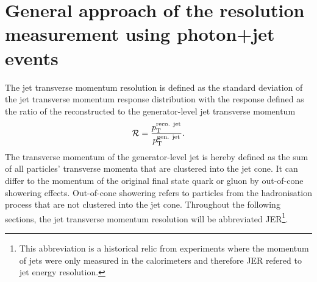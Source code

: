 \chapter{General approach of the resolution measurement using photon+jet events}
\label{res:ch:GeneralApproach}

The jet transverse momentum resolution is defined as the standard deviation of the jet transverse momentum response distribution with the response defined as the ratio of the reconstructed to the generator-level jet transverse momentum 
\begin{equation}\label{res:eq:responseFormula}
\mathcal{R} =  \frac{p_{\text{T}}^{\text{reco. jet}}}{p_{\text{T}}^{\text{gen. jet}}}.
\end{equation}
The transverse momentum of the generator-level jet is hereby defined as the sum of all particles' transverse momenta that are clustered into the jet cone.
It can differ to the momentum of the original final state quark or gluon by out-of-cone showering effects.
Out-of-cone showering refers to particles from the hadronisation process that are not clustered into the jet cone.
Throughout the following sections, the jet transverse momentum resolution will be abbreviated JER\footnote{This abbreviation is a historical relic from experiments where the momentum of jets were only measured in the calorimeters and therefore JER refered to jet energy resolution.}.

